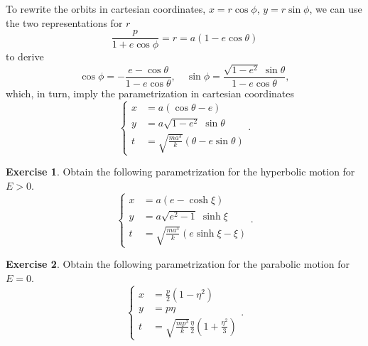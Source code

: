 \documentclass[english,fontsize=11pt,paper=b5]{scrbook}
\numberwithin{equation}{chapter}
\theoremstyle{definition}
\newtheorem{exercise}{Exercise}[chapter]
\begin{document}
    To rewrite the orbits in cartesian coordinates, $x = r \cos\phi$, $y=r \sin\phi$, we can use the two representations for $r$
    \begin{equation}
      \frac{p}{1+e\cos\phi} = r = a(1-e\cos\theta)
    \end{equation}
    to derive
    \begin{equation}
      \cos\phi = -\frac{e - \cos\theta}{1-e \cos\theta},\quad
      \sin\phi = \frac{\sqrt{1-e^2}\;\sin\theta}{1-e\cos\theta},
    \end{equation}
    which, in turn, imply the parametrization in cartesian coordinates
    \begin{equation}
      \left\lbrace
        \begin{aligned}
          x & = a(\cos\theta - e)                         \\
          y & = a\sqrt{1-e^2}\;\sin\theta                 \\
          t & = \sqrt{\frac{ma^3}k}(\theta - e\sin\theta)
        \end{aligned}
      \right..
    \end{equation}

    \begin{exercise}
      Obtain the following parametrization for the hyperbolic motion for $E>0$.
      \begin{equation}
        \left\lbrace
          \begin{aligned}
            x & = a(e- \cosh\xi)                     \\
            y & = a\sqrt{e^2-1}\;\sinh\xi            \\
            t & = \sqrt{\frac{ma^3}k}(e\sinh\xi-\xi)
          \end{aligned}
        \right..
      \end{equation}
    \end{exercise}

    \begin{exercise}
      Obtain the following parametrization for the parabolic motion for $E=0$.
      \begin{equation}
        \left\lbrace
          \begin{aligned}
            x & = \frac p2 \left(1- \eta^2\right)                            \\
            y & = p\eta                                                      \\
            t & = \sqrt{\frac{mp^3}k}\frac\eta2\left(1+\frac{\eta^2}3\right)
          \end{aligned}
        \right..
      \end{equation}
    \end{exercise}
\end{document}
